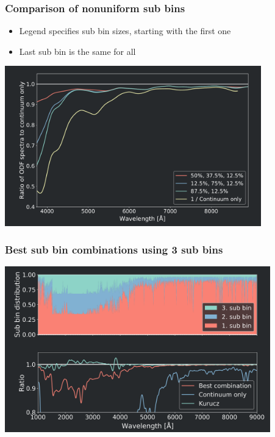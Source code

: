 {
	\frametitle{Comparison of nonuniform sub bins}
	\begin{itemize}
	    \item Legend specifies sub bin sizes, starting with the first one
	    \item Last sub bin is the same for all
	\end{itemize}
	\centering
	\includegraphics[width=111mm]{images/same_last_sub_bin}
}
\frame
{
	\frametitle{Best sub bin combinations using 3 sub bins}
	\centering
	\includegraphics[width=115mm]{images/best_combination}
}
\frame
